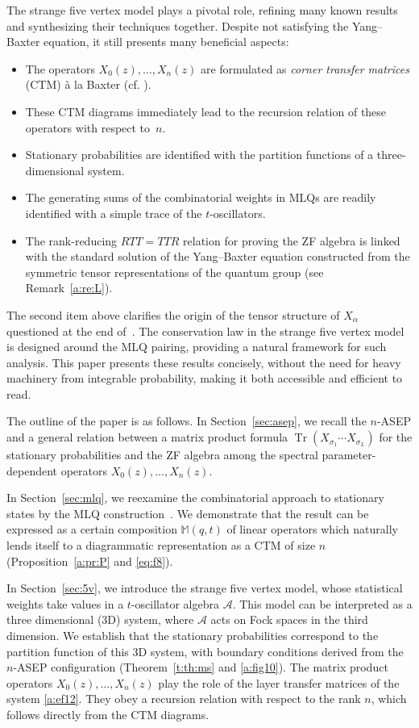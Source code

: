 \documentclass[11pt]{article}
\theoremstyle{definition}
\numberwithin{equation}{section}
\newcommand{\qoa}{\mathcal{A}}
\DeclareMathOperator{\tr}{Tr}
\begin{document}
The strange five vertex model plays a pivotal role, refining many known results~\cite{CDW,CMW,Martin20,PEM} and synthesizing their techniques together.
Despite not satisfying the Yang--Baxter equation, it still presents many beneficial aspects:
\begin{itemize}
\item The operators $X_0(z),\ldots, X_n(z)$ are formulated as \emph{corner transfer matrices} (CTM)  \`a la Baxter (cf. \cite[Chap.13]{Bax}).
\item These CTM diagrams immediately lead to the recursion relation of these operators with respect to~$n$.
\item Stationary probabilities are identified with the partition functions of a three-dimensional system.
\item The generating sums of the combinatorial weights in MLQs are readily identified with a simple trace of the $t$-oscillators.
\item The rank-reducing $RTT=TTR$ relation for proving the ZF algebra is linked with the standard solution of the Yang--Baxter equation constructed from the symmetric tensor representations of the quantum group (see Remark~\ref{a:re:L}).
\end{itemize}

The second item above clarifies the origin of the tensor structure of 
$X_\alpha$ questioned at the end of~\cite[Sec.4.2]{ANP}. 
The conservation law in the strange five vertex model is designed 
around the MLQ pairing, providing a natural framework for such analysis. 
This paper presents these results concisely, without the need for heavy 
machinery from integrable probability, making it both accessible and efficient to read.

The outline of the paper is as follows.
In Section~\ref{sec:asep}, we recall the $n$-ASEP and a general relation between 
a matrix product formula $\tr(X_{\sigma_1}\cdots X_{\sigma_L})$ 
for the stationary probabilities and the ZF algebra among the 
spectral parameter-dependent operators 
$X_0(z),\ldots, X_n(z)$.

In Section~\ref{sec:mlq}, we reexamine  the combinatorial approach to stationary states 
by the MLQ construction~\cite{CMW,Martin20}. 
We demonstrate that the result can be expressed 
as a certain composition $\mathbb{M}(q,t)$ of linear operators 
which naturally lends itself to a diagrammatic representation as a CTM of size $n$ 
(Proposition~\ref{a:pr:P} and \eqref{eq:f8}).

In Section~\ref{sec:5v}, we introduce the strange five vertex model, whose 
statistical weights take values in a $t$-oscillator algebra $\qoa$.
This model can be interpreted as a three dimensional (3D) system, 
where $\qoa$ acts on Fock spaces in the third dimension.
We establish that the stationary probabilities correspond to the partition function of this 3D system, 
with boundary conditions derived from the $n$-ASEP configuration 
(Theorem~\ref{t:th:ms} and \eqref{a:fig10}).
The matrix product operators $X_0(z),\ldots, X_n(z)$ play the  role of  
the layer transfer matrices of the system \eqref{a:ef12}.
They obey a recursion relation with respect to the rank $n$,
 which follows directly from the CTM diagrams.
\end{document}
